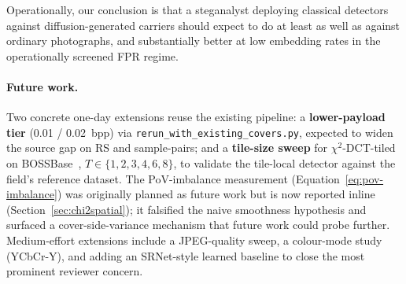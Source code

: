\documentclass[10pt,twocolumn,a4paper]{article}
\begin{document}
Operationally, our conclusion is that a steganalyst deploying classical detectors against diffusion-generated carriers should expect to do at least as well as against ordinary photographs, and substantially better at low embedding rates in the operationally screened FPR regime.

\paragraph{Future work.} Two concrete one-day extensions reuse the existing pipeline: a \textbf{lower-payload tier} (0.01 / 0.02~bpp) via \texttt{rerun\_with\_existing\_covers.py}, expected to widen the source gap on RS and sample-pairs; and a \textbf{tile-size sweep} for $\chi^2$-DCT-tiled on BOSSBase~\cite{bas2011boss}, $T\!\in\!\{1,2,3,4,6,8\}$, to validate the tile-local detector against the field's reference dataset. The PoV-imbalance measurement (Equation~\ref{eq:pov-imbalance}) was originally planned as future work but is now reported inline (Section~\ref{sec:chi2spatial}); it falsified the naive smoothness hypothesis and surfaced a cover-side-variance mechanism that future work could probe further. Medium-effort extensions include a JPEG-quality sweep, a colour-mode study (YCbCr-Y), and adding an SRNet-style learned baseline to close the most prominent reviewer concern.

\clearpage
\renewcommand{\refname}{References}
\end{document}
